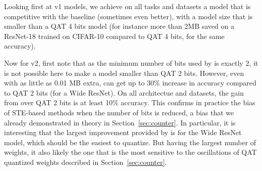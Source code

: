 \begin{table}[t!]
\caption{Penalty  and group size  for the v1 and v2 \diffq models reported on Table~\ref{tab:cifar_supp}}
\label{table_hyper_supp}
\vskip 0.15in
\begin{center}
\begin{small}
\begin{sc}
\end{sc}
\end{small}
\end{center}
\vskip -0.1in
\end{table}

Looking first at v1 models, we achieve on all tasks and datasets
a model that is competitive with the baseline (sometimes even better),
with a model size that is smaller than a QAT 4 bits model (for instance more than 2MB saved on a ResNet-18 trained on CIFAR-10 compared to QAT 4 bits, for the same accuracy).

Now for v2, first note that as the minimum number of bits used by \diffq is exactly 2, it is not possible here to make a model smaller than QAT 2 bits. However, even with as little as 0.01 MB extra, \diffq can get up to 30\% increase in accuracy compared to QAT 2 bits (for a Wide ResNet). On all architectue and datasets,
the gain from \diffq over QAT 2 bits is at least 10\% accuracy.
This confirms in practice the bias of STE-based methods when the number
of bits is reduced, a bias that we already demonstrated in theory in Section~\ref{sec:counter}. In particular, it is interesting that the largest
improvement provided by \diffq is for the Wide ResNet model, which should be the easiest to quantize. But having the largest number of weights, it 
also likely the one that is the most sensitive to the oscillations of QAT quantized weights described in Section~\ref{sec:counter}.

